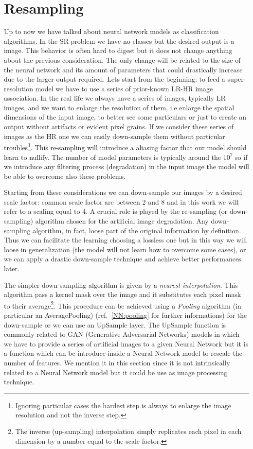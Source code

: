 \documentclass{standalone}
\begin{document}
\section[Resampling]{Resampling}\label{SR:downsampling}

Up to now we have talked about neural network models as classification algorithms.
In the SR problem we have no classes but the desired output is a image.
This behavior is often hard to digest but it does not change anything about the previous consideration.
The only change will be related to the size of the neural network and its amount of parameters that could drastically increase due to the larger output required.
Lets start from the beginning: to feed a super-resolution model we have to use a series of prior-known LR-HR image association.
In the real life we always have a series of images, typically LR images, and we want to enlarge the resolution of them, i.e enlarge the spatial dimensions of the input image, to better see some particulars or just to create an output without artifacts or evident pixel grains.
If we consider these series of images as the HR one we can easily down-sample them without particular troubles\footnote{
  Ignoring particular cases the hardest step is always to enlarge the image resolution and not the inverse step.
}.
This re-sampling will introduce a aliasing factor that our model should learn to nullify.
The number of model parameters is typically around the $10^7$ so if we introduce any filtering process (degradation) in the input image the model will be able to overcome also these problems.

Starting from these considerations we can down-sample our images by a desired scale factor: common scale factor are between 2 and 8 and in this work we will refer to a scaling equal to 4.
A crucial role is played by the re-sampling (or down-sampling) algorithm chosen for the artificial image degradation.
Any down-sampling algorithm, in fact, loose part of the original information by definition.
Thus we can facilitate the learning choosing a lossless one but in this way we will loose in generalization (the model will not learn how to overcome some cases), or we can apply a drastic down-sample technique and achieve better performances later.

The simpler down-sampling algorithm is given by a \emph{nearest interpolation}.
This algorithm pass a kernel mask over the image and it substitutes each pixel mask to their average\footnote{
  The inverse (up-sampling) interpolation simply replicates each pixel in each dimension by a number equal to the scale factor.
}.
This procedure can be achieved using a \emph{Pooling} algorithm (in particular an AveragePooling) (ref.~\ref{NN:pooling} for further informations) for the down-sample or we can use an UpSample layer.
The UpSample function is commonly related to GAN (Generative Adversarial Networks) models in which we have to provide a series of artificial images to a given Neural Network but it is a function which can be introduce inside a Neural Network model to rescale the number of features.
We mention it in this section since it is not intrinsically related to a Neural Network model but it could be use as image processing technique.
\end{document}

